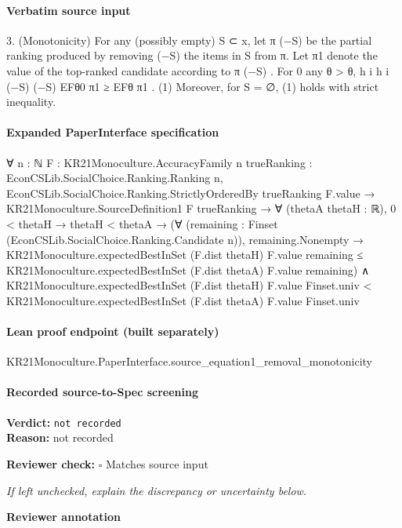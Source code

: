\documentclass[10pt]{article}
\newcommand{\reviewerbox}{%
  \par\noindent\fbox{\parbox{0.96\linewidth}{\rule{0pt}{0.38in}}}\par
}
\newcommand{\reviewmatch}[1]{%
  \par\noindent\textbf{Reviewer check:} $\square$\; #1\par
  \noindent\emph{If left unchecked, explain the discrepancy or uncertainty below.}\par
}
\begin{document}
\paragraph{Verbatim source input}
\begin{ReviewVerbatim}
3. (Monotonicity) For any (possibly empty) S ⊂ x, let π (−S) be the partial ranking produced by removing
(−S)
the items in S from π. Let π1
denote the value of the top-ranked candidate according to π (−S) . For
0
any θ > θ,
h
i
h
i
(−S)
(−S)
EFθ0 π1
≥ EFθ π1
.
(1)
Moreover, for S = ∅, (1) holds with strict inequality.
\end{ReviewVerbatim}


\paragraph{Expanded PaperInterface specification}
\begin{ReviewVerbatim}
∀ {n : ℕ} {F : KR21Monoculture.AccuracyFamily n} {trueRanking : EconCSLib.SocialChoice.Ranking.Ranking n},
  EconCSLib.SocialChoice.Ranking.StrictlyOrderedBy trueRanking F.value →
    KR21Monoculture.SourceDefinition1 F trueRanking →
      ∀ (thetaA thetaH : ℝ),
        0 < thetaH →
          thetaH < thetaA →
            (∀ (remaining : Finset (EconCSLib.SocialChoice.Ranking.Candidate n)),
                remaining.Nonempty →
                  KR21Monoculture.expectedBestInSet (F.dist thetaH) F.value remaining ≤
                    KR21Monoculture.expectedBestInSet (F.dist thetaA) F.value remaining) ∧
              KR21Monoculture.expectedBestInSet (F.dist thetaH) F.value Finset.univ <
                KR21Monoculture.expectedBestInSet (F.dist thetaA) F.value Finset.univ
\end{ReviewVerbatim}

\paragraph{Lean proof endpoint (built separately)}\begin{ReviewVerbatim}
KR21Monoculture.PaperInterface.source_equation1_removal_monotonicity
\end{ReviewVerbatim}

\paragraph{Recorded source-to-Spec screening}
\textbf{Verdict:} \texttt{not recorded}
\\
\textbf{Reason:} not recorded
\reviewmatch{Matches source input}
\noindent\textbf{Reviewer annotation}\par
\reviewerbox
\clearpage
\hypertarget{source-claim-f4aa43d846eb3ae7}{}
\end{document}
